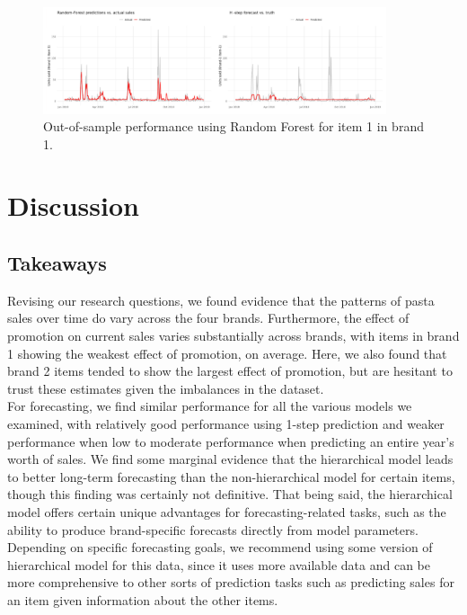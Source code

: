 \documentclass{article}
\begin{document}
\begin{figure}[ht]
\centering
\includegraphics[width=0.9\textwidth]{figures/rf_prediction.png}
\caption{Out-of-sample performance using Random Forest for item 1 in brand 1.}
\label{fig:parpred}
\end{figure}

\section{Discussion}
\subsection{Takeaways}
\noindent Revising our research questions, we found evidence that the patterns of pasta sales over time do vary across the four brands. Furthermore, the effect of promotion on current sales varies substantially across brands, with items in brand 1 showing the weakest effect of promotion, on average. Here, we also found that brand 2 items tended to show the largest effect of promotion, but are hesitant to trust these estimates given the imbalances in the dataset. \\

\noindent For forecasting, we find similar performance for all the various models we examined, with relatively good performance using 1-step prediction and weaker performance when low to moderate performance when predicting an entire year's worth of sales. We find some marginal evidence that the hierarchical model leads to better long-term forecasting than the non-hierarchical model for certain items, though this finding was certainly not definitive. That being said, the hierarchical model offers certain unique advantages for forecasting-related tasks, such as the ability to produce brand-specific forecasts directly from model parameters. Depending on specific forecasting goals, we recommend using some version of hierarchical model for this data, since it uses more available data and can be more comprehensive to other sorts of prediction tasks such as predicting sales for an item given information about the other items.
\end{document}
